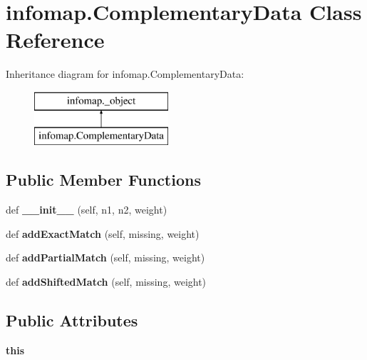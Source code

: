 \hypertarget{classinfomap_1_1ComplementaryData}{}\section{infomap.\+Complementary\+Data Class Reference}
\label{classinfomap_1_1ComplementaryData}
Inheritance diagram for infomap.\+Complementary\+Data\+:\begin{figure}[H]
\begin{center}
\leavevmode
\includegraphics[height=2.000000cm]{classinfomap_1_1ComplementaryData}
\end{center}
\end{figure}
\subsection*{Public Member Functions}
\begin{DoxyCompactItemize}
\item 
\mbox{\label{classinfomap_1_1ComplementaryData_a1ba0ef1c970dd649c2e5e9ddbc82b1ff}} 
def {\bfseries \+\_\+\+\_\+init\+\_\+\+\_\+} (self, n1, n2, weight)
\item 
\mbox{\label{classinfomap_1_1ComplementaryData_a2126267348d696f61ff680cae8a3b490}} 
def {\bfseries add\+Exact\+Match} (self, missing, weight)
\item 
\mbox{\label{classinfomap_1_1ComplementaryData_a0fda9aa0ac0ce7c367e6f55f750699b7}} 
def {\bfseries add\+Partial\+Match} (self, missing, weight)
\item 
\mbox{\label{classinfomap_1_1ComplementaryData_a56c7efbe038e2a268d95d9ba7baf5569}} 
def {\bfseries add\+Shifted\+Match} (self, missing, weight)
\end{DoxyCompactItemize}
\subsection*{Public Attributes}
\begin{DoxyCompactItemize}
\item 
\mbox{\label{classinfomap_1_1ComplementaryData_af346429703a8ac46629fa098555bbf87}} 
{\bfseries this}
\end{DoxyCompactItemize}
